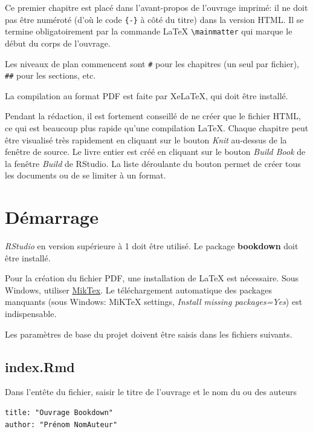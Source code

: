 \documentclass[
  11pt,
  american,
  a4paper,
  extrafontsizes,onecolumn,openright
  ]{memoir}
\begin{document}
Ce premier chapitre est placé dans l'avant-propos de l'ouvrage imprimé: il ne doit pas être numéroté (d'où le code \texttt{\{-\}} à côté du titre) dans la version HTML. Il se termine obligatoirement par la commande LaTeX \texttt{\textbackslash{}mainmatter} qui marque le début du corps de l'ouvrage.

Les niveaux de plan commencent sont \texttt{\#} pour les chapitres (un seul par fichier), \texttt{\#\#} pour les sections, etc.

La compilation au format PDF est faite par XeLaTeX, qui doit être installé.

Pendant la rédaction, il est fortement conseillé de ne créer que le fichier HTML, ce qui est beaucoup plus rapide qu'une compilation LaTeX.
Chaque chapitre peut être visualisé très rapidement en cliquant sur le bouton \emph{Knit} au-dessus de la fenêtre de source.
Le livre entier est créé en cliquant sur le bouton \emph{Build Book} de la fenêtre \emph{Build} de RStudio.
La liste déroulante du bouton permet de créer tous les documents ou de se limiter à un format.

\mainmatter

\hypertarget{Demarrage}{%
\chapter{Démarrage}\label{Demarrage}}

\emph{RStudio} en version supérieure à 1 doit être utilisé.
Le package \textbf{bookdown} doit être installé.

Pour la création du fichier PDF, une installation de LaTeX est nécessaire.
Sous Windows, utiliser \href{https://miktex.org/download}{MikTex}.
Le téléchargement automatique des packages manquants (sous Windows: MiKTeX settings, \emph{Install missing packages=Yes}) est indispensable.

Les paramètres de base du projet doivent être saisis dans les fichiers suivants.

\hypertarget{index.rmd}{%
\section{index.Rmd}\label{index.rmd}}

Dans l'entête du fichier, saisir le titre de l'ouvrage et le nom du ou des auteurs

\begin{verbatim}
title: "Ouvrage Bookdown" 
author: "Prénom NomAuteur"
\end{verbatim}
\end{document}
